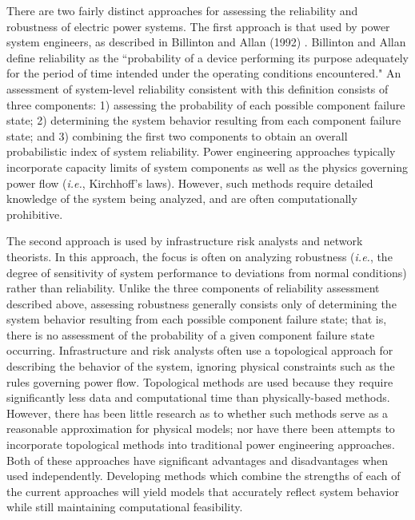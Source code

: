 There are two fairly distinct approaches for assessing the reliability and robustness of electric power systems. The first approach is that used by power system engineers, as described in Billinton and Allan (1992) \cite{Billinton1992}.  Billinton and Allan define reliability as the ``probability of a device performing its purpose adequately for the period of time intended under the operating conditions encountered."  An assessment of system-level reliability consistent with this definition consists of three components: 1) assessing the probability of each possible component failure state; 2) determining the system behavior resulting from each component failure state; and 3) combining the first two components to obtain an overall probabilistic index of system reliability.  Power engineering approaches typically incorporate capacity limits of system components as well as the physics governing power flow (\emph{i.e.}, Kirchhoff's laws).  However, such methods require detailed knowledge of the system being analyzed, and are often computationally prohibitive.

The second approach is used by infrastructure risk analysts and network theorists.  In this approach, the focus is often on analyzing robustness (\emph{i.e.}, the degree of sensitivity of system performance to deviations from normal conditions) rather than reliability.  Unlike the three components of reliability assessment described above, assessing robustness generally consists only of determining the system behavior resulting from each possible component failure state; that is, there is no assessment of the probability of a given component failure state occurring.  Infrastructure and risk analysts often use a topological approach for describing the behavior of the system, ignoring physical constraints such as the rules governing power flow.  Topological methods are used because they require significantly less data and computational time than physically-based methods.  However, there has been little research as to whether such methods serve as a reasonable approximation for physical models; nor have there been attempts to incorporate topological methods into traditional power engineering approaches.  Both of these approaches have significant advantages and disadvantages when used independently.  Developing methods which combine the strengths of each of the current approaches will yield models that accurately reflect system behavior while still maintaining computational feasibility.

